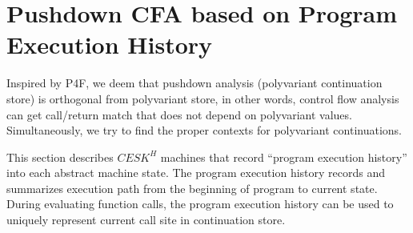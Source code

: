\documentclass{article}
\begin{document}
\section{Pushdown CFA based on Program Execution History}
\label{sec:hcfa}
Inspired by P4F, we deem that pushdown analysis (polyvariant continuation store) is orthogonal from polyvariant store, in other words, control flow analysis can get call/return match that does not depend on polyvariant values. Simultaneously, we try to find the proper contexts for polyvariant continuations.

This section describes $CESK^H$ machines that record ``program execution history'' into each abstract machine state.
The program execution history records and summarizes execution path from the beginning of program to current state.
During evaluating function calls, the program execution history can be used to uniquely represent current call site in continuation store.
\end{document}
